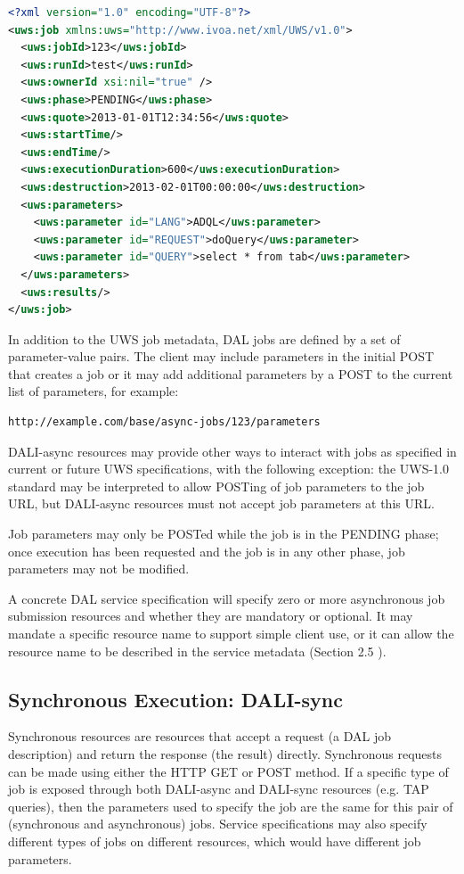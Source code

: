 \documentclass[11pt,letter]{ivoa}
\begin{document}
\begin{lstlisting}[language=XML,basicstyle=\footnotesize]
<?xml version="1.0" encoding="UTF-8"?>
<uws:job xmlns:uws="http://www.ivoa.net/xml/UWS/v1.0">
  <uws:jobId>123</uws:jobId>
  <uws:runId>test</uws:runId>
  <uws:ownerId xsi:nil="true" />
  <uws:phase>PENDING</uws:phase>
  <uws:quote>2013-01-01T12:34:56</uws:quote>
  <uws:startTime/>
  <uws:endTime/>
  <uws:executionDuration>600</uws:executionDuration>
  <uws:destruction>2013-02-01T00:00:00</uws:destruction>
  <uws:parameters>
    <uws:parameter id="LANG">ADQL</uws:parameter>
    <uws:parameter id="REQUEST">doQuery</uws:parameter>
    <uws:parameter id="QUERY">select * from tab</uws:parameter>
  </uws:parameters>
  <uws:results/>
</uws:job>
\end{lstlisting}

In addition to the UWS job metadata, DAL jobs are defined by a set of
parameter-value pairs. The client may include parameters in the initial POST
that creates a job or it may add additional parameters by a POST to the current
list of parameters, for example:

\begin{verbatim}
http://example.com/base/async-jobs/123/parameters
\end{verbatim}

DALI-async resources may provide other ways to interact with jobs as specified
in current or future UWS specifications, with the following exception: the
UWS-1.0 standard may be interpreted to allow POSTing of job parameters to the
job URL, but DALI-async resources must not accept job parameters at this URL.

Job parameters may only be POSTed while the job is in the PENDING phase; once
execution has been requested and the job is in any other phase, job parameters
may not be modified.

A concrete DAL service specification will specify zero or more asynchronous job
submission resources and whether they are mandatory or optional. It may mandate
a specific resource name to support simple client use, or it can allow the
resource name to be described in the service metadata (Section 2.5 ).

\subsection{Synchronous Execution: DALI-sync}
\label{sec:dali-sync}
Synchronous resources are resources that accept a request (a DAL job
description) and return the response (the result) directly. Synchronous requests
can be made using either the HTTP GET or POST method. If a specific type of job
is exposed through both DALI-async and DALI-sync resources (e.g. TAP queries),
then the parameters used to specify the job are the same for  this pair of
(synchronous and asynchronous) jobs. Service specifications may also specify
different types of jobs on different resources, which would have different job
parameters.
\end{document}
